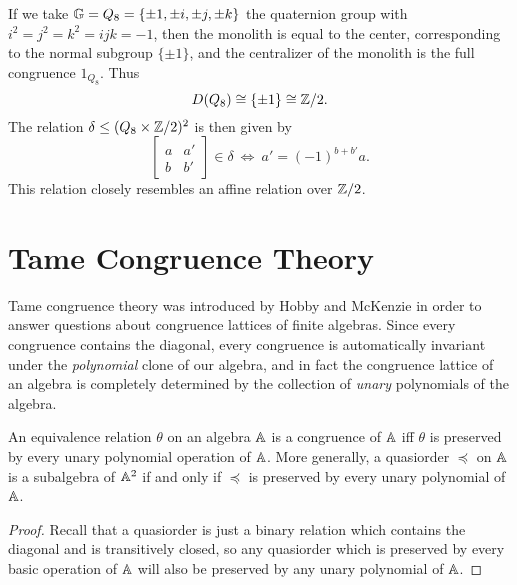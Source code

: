 \begin{appendices}
\begin{ex} If we take $\mathbb{G} = Q_8 = \{\pm 1, \pm i, \pm j, \pm k\}$ the quaternion group with $i^2 = j^2 = k^2 = ijk = -1$, then the monolith is equal to the center, corresponding to the normal subgroup $\{\pm 1\}$, and the centralizer of the monolith is the full congruence $1_{Q_8}$. Thus
\[
D(Q_8) \cong \{\pm 1\} \cong \mathbb{Z}/2.
\]
The relation $\delta \le (Q_8 \times \mathbb{Z}/2)^2$ is then given by
\[
\begin{bmatrix} a & a'\\ b & b'\end{bmatrix} \in \delta\ \iff\ a' = (-1)^{b + b'}a.
\]
This relation closely resembles an affine relation over $\mathbb{Z}/2$.
\end{ex}






\chapter{Tame Congruence Theory}\label{a-tct}

Tame congruence theory was introduced by Hobby and McKenzie \cite{hobby-mckenzie} in order to answer questions about congruence lattices of finite algebras. Since every congruence contains the diagonal, every congruence is automatically invariant under the \emph{polynomial} clone of our algebra, and in fact the congruence lattice of an algebra is completely determined by the collection of \emph{unary} polynomials of the algebra.

\begin{prop} An equivalence relation $\theta$ on an algebra $\mathbb{A}$ is a congruence of $\mathbb{A}$ iff $\theta$ is preserved by every unary polynomial operation of $\mathbb{A}$. More generally, a quasiorder $\preceq$ on $\mathbb{A}$ is a subalgebra of $\mathbb{A}^2$ if and only if $\preceq$ is preserved by every unary polynomial of $\mathbb{A}$.
\end{prop}
\begin{proof} Recall that a quasiorder is just a binary relation which contains the diagonal and is transitively closed, so any quasiorder which is preserved by every basic operation of $\mathbb{A}$ will also be preserved by any unary polynomial of $\mathbb{A}$.


\end{proof}
\end{appendices}
